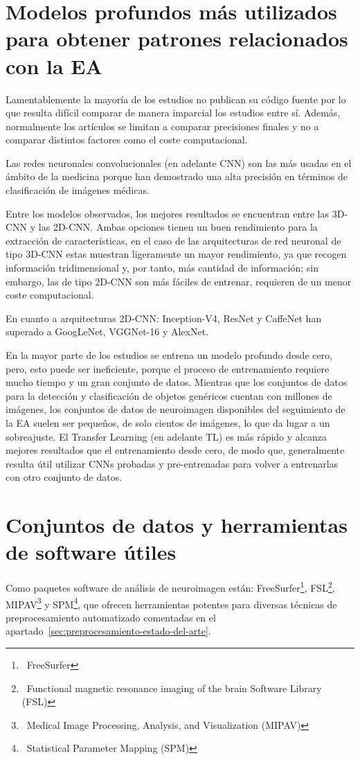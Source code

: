 \section{Modelos profundos más utilizados para obtener patrones relacionados con la EA}
\label{sec:modelos-profundos-estado-del-arte}
Lamentablemente la mayoría de los estudios no publican su código fuente por lo que resulta difícil comparar de manera
imparcial los estudios entre sí.
Además, normalmente los artículos se limitan a comparar precisiones finales y no a comparar distintos factores como el
coste computacional.

Las redes neuronales convolucionales (en adelante CNN) son las más usadas en el ámbito de la medicina porque han
demostrado una alta precisión en términos de clasificación de imágenes médicas.

Entre los modelos observados, los mejores resultados se encuentran entre las 3D-CNN y las 2D-CNN. Ambas opciones tienen
un buen rendimiento para la extracción de características, en el caso de las arquitecturas de red neuronal de tipo
3D-CNN estas muestran ligeramente un mayor rendimiento, ya que recogen información tridimensional y, por tanto, más
cantidad de información;
sin embargo, las de tipo 2D-CNN son más fáciles de entrenar, requieren de un menor coste computacional.

En cuanto a arquitecturas 2D-CNN: Inception-V4, ResNet y CaffeNet han superado a GoogLeNet, VGGNet-16 y AlexNet.

En la mayor parte de los estudios se entrena un modelo profundo desde cero, pero, esto puede ser ineficiente, porque
el proceso de entrenamiento requiere mucho tiempo y un gran conjunto de datos.
Mientras que los conjuntos de datos para la detección y clasificación de objetos genéricos cuentan con millones de
imágenes, los conjuntos de datos de neuroimagen disponibles del seguimiento de la EA suelen ser pequeños, de solo
cientos de imágenes, lo que da lugar a un sobreajuste.
El Transfer Learning (en adelante TL) es más rápido y alcanza mejores resultados que el entrenamiento desde cero, de
modo que, generalmente resulta útil utilizar CNNs probadas y pre-entrenadas para volver a entrenarlas con otro conjunto
de datos.

\section{Conjuntos de datos y herramientas de software útiles}\label{sec:datos-y-herramientas-estado-del-arte}
Como paquetes software de análisis de neuroimagen están:
FreeSurfer\footnote{~\cite{freeSurfer}{FreeSurfer}},
FSL\footnote{~\cite{fsl}{Functional magnetic resonance imaging of the brain Software Library (FSL)}},
MIPAV\footnote{~\cite{mipav}{Medical Image Processing, Analysis, and Visualization (MIPAV)}}
y SPM\footnote{~\cite{spm}{Statistical Parameter Mapping (SPM)}},
que ofrecen herramientas potentes para diversas técnicas de preprocesamiento automatizado comentadas en el
apartado~\ref{sec:preprocesamiento-estado-del-arte}.

